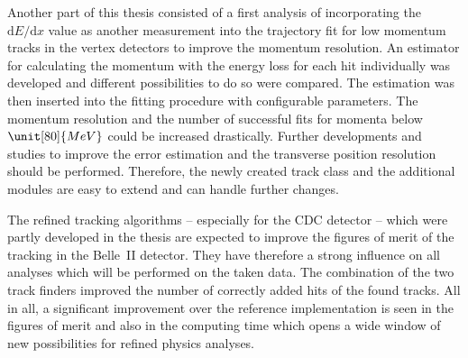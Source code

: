 Another part of this thesis consisted of a first analysis of incorporating the $\mathrm dE/\mathrm d x$ value as another measurement into the trajectory fit for low momentum tracks in the vertex detectors to improve the momentum resolution. An estimator for calculating the momentum with the energy loss for each hit individually was developed and different possibilities to do so were compared. The estimation was then inserted into the fitting procedure with configurable parameters. The momentum resolution and the number of successful fits for momenta below $\unit[80]{MeV}$ could be increased drastically. Further developments and studies to improve the error estimation and the transverse position resolution should be performed. Therefore, the newly created track class and the additional modules are easy to extend and can handle further changes.


The refined tracking algorithms -- especially for the CDC detector -- which were partly developed in the thesis are expected to improve the figures of merit of the tracking in the Belle~II detector. They have therefore a strong influence on all analyses which will be performed on the taken data. The combination of the two track finders improved the number of correctly added hits of the found tracks. All in all, a significant improvement over the reference implementation is seen in the figures of merit and also in the computing time which opens a wide window of new possibilities for refined physics analyses.